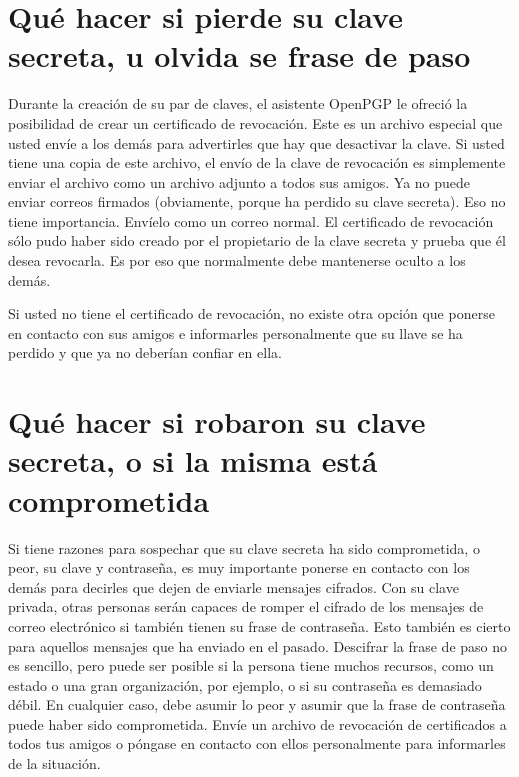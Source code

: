 \documentclass[10pt,a5paper,twoside,,]{book}
\begin{document}
\section{Qué hacer si pierde su clave secreta, u olvida se frase de
paso}\label{quuxe9-hacer-si-pierde-su-clave-secreta-u-olvida-se-frase-de-paso}

Durante la creación de su par de claves, el asistente OpenPGP le ofreció
la posibilidad de crear un certificado de revocación. Este es un archivo
especial que usted envíe a los demás para advertirles que hay que
desactivar la clave. Si usted tiene una copia de este archivo, el envío
de la clave de revocación es simplemente enviar el archivo como un
archivo adjunto a todos sus amigos. Ya no puede enviar correos firmados
(obviamente, porque ha perdido su clave secreta). Eso no tiene
importancia. Envíelo como un correo normal. El certificado de revocación
sólo pudo haber sido creado por el propietario de la clave secreta y
prueba que él desea revocarla. Es por eso que normalmente debe
mantenerse oculto a los demás.

Si usted no tiene el certificado de revocación, no existe otra opción
que ponerse en contacto con sus amigos e informarles personalmente que
su llave se ha perdido y que ya no deberían confiar en ella.

\section{Qué hacer si robaron su clave secreta, o si la misma está
comprometida}\label{quuxe9-hacer-si-robaron-su-clave-secreta-o-si-la-misma-estuxe1-comprometida}

Si tiene razones para sospechar que su clave secreta ha sido
comprometida, o peor, su clave y contraseña, es muy importante ponerse
en contacto con los demás para decirles que dejen de enviarle mensajes
cifrados. Con su clave privada, otras personas serán capaces de romper
el cifrado de los mensajes de correo electrónico si también tienen su
frase de contraseña. Esto también es cierto para aquellos mensajes que
ha enviado en el pasado. Descifrar la frase de paso no es sencillo, pero
puede ser posible si la persona tiene muchos recursos, como un estado o
una gran organización, por ejemplo, o si su contraseña es demasiado
débil. En cualquier caso, debe asumir lo peor y asumir que la frase de
contraseña puede haber sido comprometida. Envíe un archivo de revocación
de certificados a todos tus amigos o póngase en contacto con ellos
personalmente para informarles de la situación.
\end{document}
